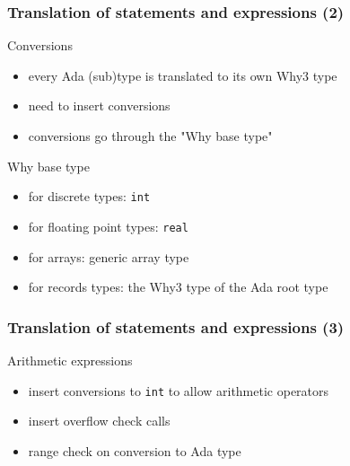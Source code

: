\documentclass{beamer}
\newenvironment{specialframe}{%
  \begin{frame}[fragile,environment=specialframe]}{\end{frame}}
\begin{document}
\begin{specialframe}\frametitle{Translation of statements and expressions (2) }
   \begin{block}{Conversions}
      \begin{itemize}
         \item every Ada (sub)type is translated to its own Why3 type
         \item need to insert conversions
         \item conversions go through the "Why base type"
      \end{itemize}
   \end{block}
   \begin{block}{Why base type}
      \begin{itemize}
         \item for discrete types: \verb|int|
         \item for floating point types: \verb|real|
         \item for arrays: generic array type
         \item for records types: the Why3 type of the Ada root type
      \end{itemize}
   \end{block}
\end{specialframe}

\begin{specialframe}\frametitle{Translation of statements and expressions (3) }
   \begin{block}{Arithmetic expressions}
      \begin{itemize}
         \item insert conversions to \verb|int| to allow arithmetic operators
         \item insert overflow check calls
         \item range check on conversion to Ada type
      \end{itemize}
   \end{block}
\end{specialframe}
\end{document}
